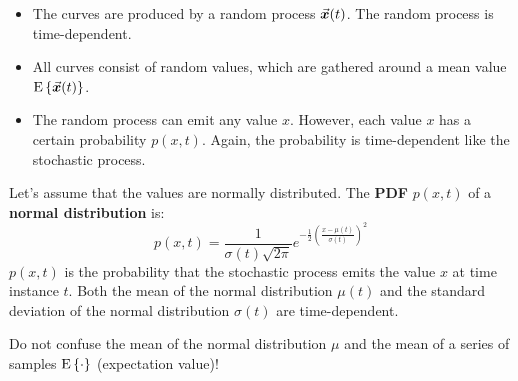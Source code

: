 \begin{refsection}
\begin{itemize}
	\item The curves are produced by a random process $\vec{\bm{x}}(t)$. The random process is time-dependent.
	\item All curves consist of random values, which are gathered around a mean value $\mathrm{E}\left\{\vec{\bm{x}}(t)\right\}$.
	\item The random process can emit any value $x$. However, each value $x$ has a certain probability $p(x, t)$. Again, the probability is time-dependent like the stochastic process.
\end{itemize}

Let's assume that the values are normally distributed. The  \textbf{\ac{PDF}} $p(x, t)$ of a  \textbf{normal distribution} is:
\begin{equation}
	p(x, t) = \frac{1}{\sigma(t) \sqrt{2 \pi}} e^{-\frac{1}{2} \left(\frac{x - \mu(t)}{\sigma(t)}\right)^2}
\end{equation}
$p(x, t)$ is the probability that the stochastic process emits the value $x$ at time instance $t$. Both the mean of the normal distribution $\mu(t)$ and the standard deviation of the normal distribution $\sigma(t)$ are time-dependent.

\begin{attention}
	Do not confuse the mean of the normal distribution $\mu$ and the mean of a series of samples $\mathrm{E}\left\{\cdot\right\}$ (expectation value)!
\end{attention}

\begin{figure}[H]
	\centering
\end{figure}
\end{refsection}
